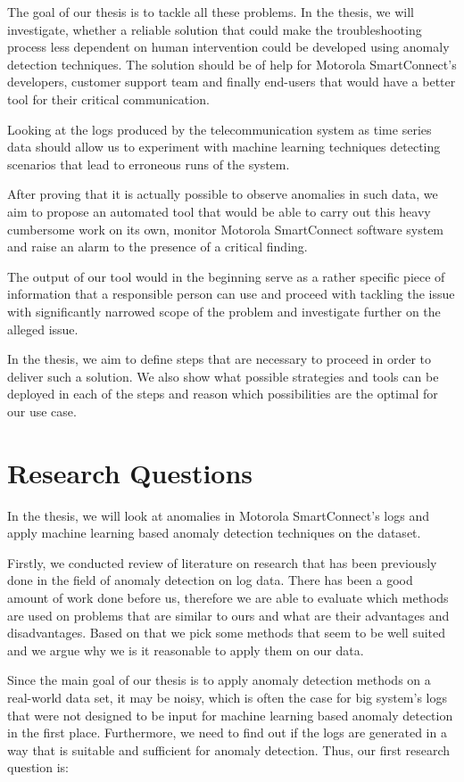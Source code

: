 The goal of our thesis is to tackle all these problems. 
In the thesis, we will investigate, whether a reliable solution that could make the troubleshooting process less dependent on human intervention could be developed using anomaly detection techniques.
The solution should be of help for Motorola SmartConnect's developers, customer support team and finally end-users that would have a better tool for their critical communication.

Looking at the logs produced by the telecommunication system as time series data should allow us to experiment with machine learning techniques detecting scenarios that lead to erroneous runs of the system.

After proving that it is actually possible to observe anomalies in such data, we aim to propose an automated tool that would be able to carry out this heavy cumbersome work on its own, monitor Motorola SmartConnect software system and raise an alarm to the presence of a critical finding.

The output of our tool would in the beginning serve as a rather specific piece of information that a responsible person can use and proceed with tackling the issue with significantly narrowed scope of the problem and investigate further on the alleged issue.

In the thesis, we aim to define steps that are necessary to proceed in order to deliver such a solution. We also show what possible strategies and tools can be deployed in each of the steps and reason which possibilities are the optimal for our use case.


\section{Research Questions}

In the thesis, we will look at anomalies in Motorola SmartConnect's logs and apply machine learning based anomaly detection techniques on the dataset.

Firstly, we conducted review of literature on research that has been previously done in the field of anomaly detection on log data. There has been a good amount of work done before us, therefore we are able to evaluate which methods are used on problems that are similar to ours and what are their advantages and disadvantages. Based on that we pick some methods that seem to be well suited and we argue why we is it reasonable to apply them on our data.

Since the main goal of our thesis is to apply anomaly detection methods on a real-world data set, it may be noisy, which is often the case for big system's logs that were not designed to be input for machine learning based anomaly detection in the first place. 
Furthermore, we need to find out if the logs are generated in a way that is suitable and sufficient for anomaly detection. Thus, our first research question is:\\

